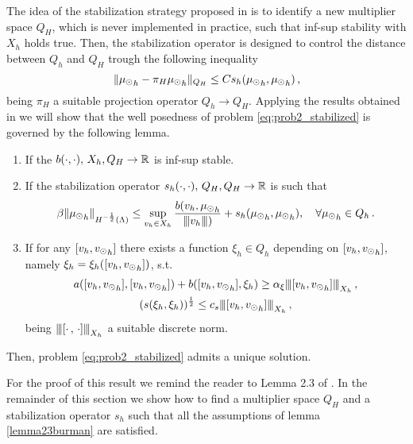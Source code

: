 The idea of the stabilization strategy proposed in \cite{burman2014}
is to identify a new multiplier space $Q_H$, which is never implemented in practice, such that inf-sup stability with $X_h$ holds true. Then, the stabilization operator is designed to control the distance between $Q_h$ and $Q_H$ trough the following inequality
\begin{equation*}
    \|{\mu_{\odot}}_h - \pi_H {\mu_{\odot}}_h\|_{Q_H} \leq C s_h({\mu_{\odot}}_h, {\mu_{\odot}}_h)\,,
\end{equation*}
being $\pi_H$ a suitable projection operator $Q_h \rightarrow Q_H$. Applying the results obtained in \cite{burman2014} we will show that the well posedness of problem \eqref{eq:prob2_stabilized} is governed by the following lemma.
\begin{lemma}\label{lemma23burman}
\begin{enumerate}
    \item If the $b(\cdot,\cdot),\, X_h,Q_H \rightarrow \mathbb{R}$ is inf-sup stable.
    \item If the stabilization operator $s_h(\cdot,\cdot),\, Q_H,Q_H \rightarrow \mathbb{R}$ is such that
    \begin{equation*}
        \beta \|{\mu_{\odot}}_h\|_{H^{-\frac12}(\Lambda)} \leq \sup\limits_{v_h \in X_h} \frac{b(v_h,{\mu_{\odot}}_h}{{\left\vert\kern-0.25ex\left\vert\kern-0.25ex\left\vert v_h \right\vert\kern-0.25ex\right\vert\kern-0.25ex\right\vert})} + s_h({\mu_{\odot}}_h, {\mu_{\odot}}_h), \quad \forall {\mu_{\odot}}_h \in Q_h\,.
    \end{equation*}
    \item If for any $[v_h, {v_{\odot}}_h]$ there exists a function $\xi_h\in Q_h$ depending on $[v_h, {v_{\odot}}_h]$, namely $\xi_h=\xi_h([v_h, {v_{\odot}}_h])$, s.t.
\begin{gather}
\label{stab_coercivity}
a([v_h, {\vd}_h],[v_h, {\vd}_h] ) + b([v_h, {\vd}_h], \xi_h) \geq \alpha_\xi \vertiii{[v_h, {\vd}_h]}_{X_h}\,,
\\
\label{stab_stability}
(s(\xi_{h}, \xi_{h}))^{\frac 12} \leq c_s \vertiii{[v_h, {\vd}_h]}_{X_h}\,,
\end{gather}
being ${\left\vert\kern-0.25ex\left\vert\kern-0.25ex\left\vert [\cdot \, ,\, \cdot]  \right\vert\kern-0.25ex\right\vert\kern-0.25ex\right\vert}_{X_h}$ a suitable discrete norm. 
\end{enumerate}
Then, problem \eqref{eq:prob2_stabilized} admits a unique solution.
\end{lemma}
For the proof of this result we remind the reader to Lemma 2.3 of \cite{burman2014}. In the remainder of this section we show how to find a multiplier space $Q_H$ and a stabilization operator $s_h$ such that all the assumptions of lemma \ref{lemma23burman} are satisfied.


